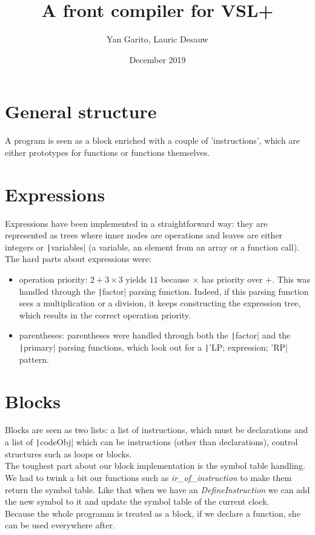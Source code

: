 \documentclass{article}
\title{A front compiler for VSL+}
\author{Yan Garito, Lauric Desauw}
\date{December 2019}
\newcommand{\code}[1]{\texttt|#1|}
\begin{document}
\maketitle


\section{General structure}

A program is seen as a block enriched with a couple of 'instructions', which are either prototypes for functions or functions themselves.


\section{Expressions}

Expressions have been implemented in a straightforward way: they are represented as trees where inner nodes are operations and leaves are either integers or \code{variables} (a variable, an element from an array or a function call). \\
The hard parts about expressions were:
\begin{itemize}

\item operation priority: $2+3 \times 3$ yields $11$ because $\times$ has priority over $+$. This was handled through the \code{factor} parsing function. Indeed, if this parsing function sees a multiplication or a division, it keeps constructing the expression tree, which results in the correct operation priority.
\item parentheses: parentheses were handled through both the \code{factor} and the \code{primary} parsing functions, which look out for a \code{'LP; expression; 'RP} pattern. 
  
\end{itemize}
  
\section{Blocks}

Blocks are seen as two lists: a list of instructions, which must be declarations and a list of \code{codeObj} which can be instructions (other than declarations), control structures such as loops or blocks. \\
The toughest part about our block implementation is the symbol table handling. We had to twink a bit our functions such as \emph{ir_of_instruction} to make them return the symbol table. Like that when we have an \emph{DefineInstruction} we can add the new symbol to it and update the symbol table of the current clock. \\
Because the whole programm is treated as a block, if we declare a function, she can be used everywhere after. 
\end{document}
